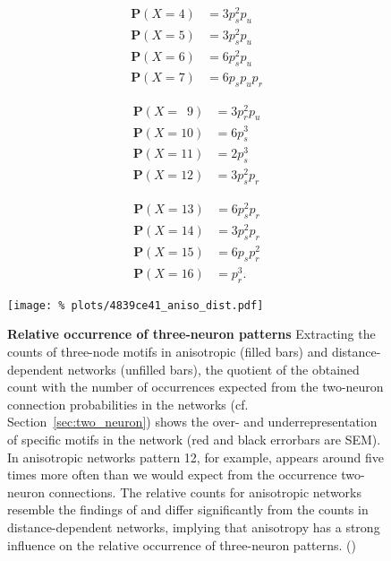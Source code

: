 \begin{minipage}{\linewidth}
  \begin{minipage}[c]{0.32\textwidth}
    \begin{align*}
      \mathbf{P}(X=4) &    =   3 p_s^2 p_u\\
      \mathbf{P}(X=5) &    =   3 p_s^2 p_u\\
      \mathbf{P}(X=6) &    =   6 p_s^2 p_u\\
      \mathbf{P}(X=7) &    =   6 p_s p_u p_r
    \end{align*}
  \end{minipage}%
  \begin{minipage}[c]{0.32\textwidth}
    \begin{align*}
      \mathbf{P}(X=\,\,\,9) &    =   3 p_r^2 p_u\\
      \mathbf{P}(X=10) &   =   6 p_s^3   \\
      \mathbf{P}(X=11) &   =   2 p_s^3    \\
      \mathbf{P}(X=12) &   =   3 p_s^2 p_r
    \end{align*}
  \end{minipage}%
  \begin{minipage}[c]{0.32\textwidth}
    \begin{align*}
      \mathbf{P}(X=13) &   =   6 p_s^2 p_r\\
      \mathbf{P}(X=14) &   =   3 p_s^2 p_r\\
      \mathbf{P}(X=15) &   =   6 p_s p_r^2\\
      \mathbf{P}(X=16) &   =   p_r^3.
    \end{align*}
  \end{minipage}  
\end{minipage}

\begin{figure}[H]
  \centering
  \texttt{[image: \%
    plots/4839ce41\_aniso\_dist.pdf]}
  \captionsetup{skip=8pt}
  \caption{\textbf{Relative occurrence of three-neuron patterns}
    Extracting the counts of three-node motifs in anisotropic (filled
    bars) and distance-dependent networks (unfilled bars), the
    quotient of the obtained count with the number of occurrences
    expected from the two-neuron connection probabilities in the
    networks (cf. Section~\ref{sec:two_neuron}) shows the over- and
    underrepresentation of specific motifs in the network (red and
    black errorbars are SEM). In anisotropic networks pattern 12, for
    example, appears around five times more often than we would expect
    from the occurrence two-neuron connections. The relative counts
    for anisotropic networks resemble the findings of
    \textcite{Song2005} and differ significantly from the counts in
    distance-dependent networks, implying that anisotropy has a strong
    influence on the relative occurrence of three-neuron
    patterns. () }
  \label{fig:3motif_single}
\end{figure}


